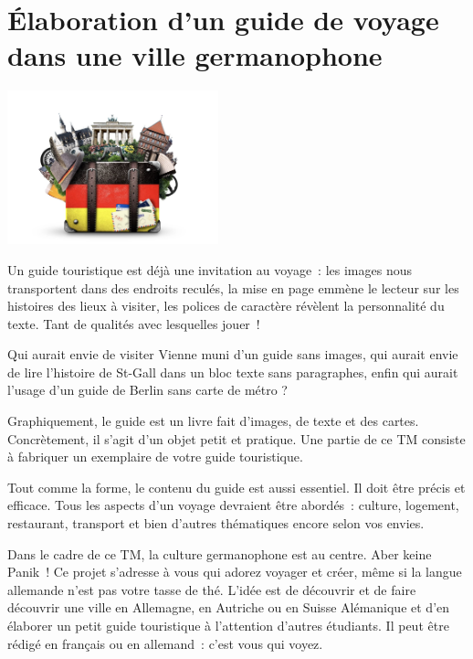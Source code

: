 \documentclass[
  10pt,
  french,
  a5paper,
  openany]{book}
\begin{document}
\hypertarget{uxe9laboration-dun-guide-de-voyage-dans-une-ville-germanophone}{%
\chapter{Élaboration d'un guide de voyage dans une ville germanophone}\label{uxe9laboration-dun-guide-de-voyage-dans-une-ville-germanophone}}

\begin{center}
\includegraphics[width=\textwidth,height=12em]{images/elaboration-dun-guide-de-voyage.jpg}

\end{center}

Un guide touristique est déjà une invitation au voyage~: les images nous transportent dans des endroits reculés, la mise en page emmène le lecteur sur les histoires des lieux à visiter, les polices de caractère révèlent la personnalité du texte. Tant de qualités avec lesquelles jouer~!

Qui aurait envie de visiter Vienne muni d'un guide sans images, qui aurait envie de lire l'histoire de St-Gall dans un bloc texte sans paragraphes, enfin qui aurait l'usage d'un guide de Berlin sans carte de métro ?

Graphiquement, le guide est un livre fait d'images, de texte et des cartes. Concrètement, il s'agit d'un objet petit et pratique. Une partie de ce TM consiste à fabriquer un exemplaire de votre guide touristique.

Tout comme la forme, le contenu du guide est aussi essentiel. Il doit être précis et efficace. Tous les aspects d'un voyage devraient être abordés~: culture, logement, restaurant, transport et bien d'autres thématiques encore selon vos envies.

Dans le cadre de ce TM, la culture germanophone est au centre. Aber keine Panik~! Ce projet s'adresse à vous qui adorez voyager et créer, même si la langue allemande n'est pas votre tasse de thé. L'idée est de découvrir et de faire découvrir une ville en Allemagne, en Autriche ou en Suisse Alémanique et d'en élaborer un petit guide touristique à l'attention d'autres étudiants. Il peut être rédigé en français ou en allemand~: c'est vous qui voyez.
\end{document}
